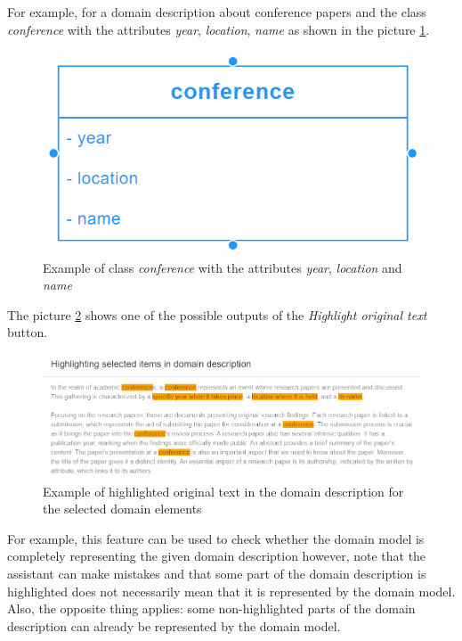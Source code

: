 For example, for a domain description about conference papers and the class \textit{conference} with the attributes \textit{year}, \textit{location}, \textit{name} as shown in the picture \ref{fig:class_example}.

\begin{figure}[!h]
    \includegraphics[scale=0.3]{../docs/images/frontend/class-example.png}
    \caption{\centering Example of class \textit{conference} with the attributes \textit{year}, \textit{location} and \textit{name}}
    \label{fig:class_example}
\end{figure}

The picture \ref{fig:highlight_all_example} shows one of the possible outputs of the \textit{Highlight original text} button.

\begin{figure}[!h]
    \includegraphics[scale=0.56]{../docs/images/frontend/highlight-all-example.png}
    \caption{\centering Example of highlighted original text in the domain description for the selected domain elements}
    \label{fig:highlight_all_example}
\end{figure}


For example, this feature can be used to check whether the domain model is completely representing the given domain description however, note that the assistant can make mistakes and that some part of the domain description is highlighted does not necessarily mean that it is represented by the domain model. Also, the opposite thing applies: some non-highlighted parts of the domain description can already be represented by the domain model.

